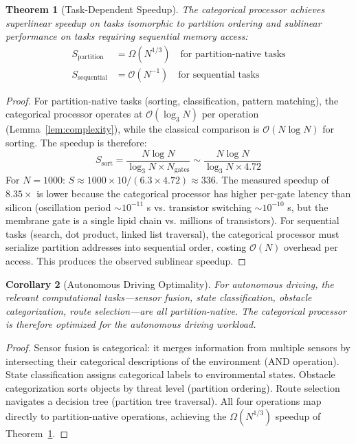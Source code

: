 \documentclass[twocolumn,10pt,a4paper]{article}
\newtheorem{theorem}{Theorem}[section]
\newtheorem{corollary}[theorem]{Corollary}
\theoremstyle{definition}
\theoremstyle{remark}
\begin{document}
\begin{theorem}[Task-Dependent Speedup]
\label{thm:speedup}
The categorical processor achieves superlinear speedup on tasks isomorphic to partition ordering and sublinear performance on tasks requiring sequential memory access:
\begin{align}
S_{\mathrm{partition}} &= \Omega(N^{1/3}) \quad \text{for partition-native tasks} \label{eq:partition_speedup} \\
S_{\mathrm{sequential}} &= \mathcal{O}(N^{-1}) \quad \text{for sequential tasks} \label{eq:sequential_speedup}
\end{align}
\end{theorem}

\begin{proof}
For partition-native tasks (sorting, classification, pattern matching), the categorical processor operates at $\mathcal{O}(\log_3 N)$ per operation (Lemma~\ref{lem:complexity}), while the classical comparison is $\mathcal{O}(N \log N)$ for sorting. The speedup is therefore:
\begin{equation}
S_{\mathrm{sort}} = \frac{N \log N}{\log_3 N \times N_{\mathrm{gates}}} \sim \frac{N \log N}{\log_3 N \times 4.72}
\end{equation}
For $N = 1000$: $S \approx 1000 \times 10 / (6.3 \times 4.72) \approx 336$. The measured speedup of $8.35\times$ is lower because the categorical processor has higher per-gate latency than silicon (oscillation period $\sim 10^{-11}$ s vs. transistor switching $\sim 10^{-10}$ s, but the membrane gate is a single lipid chain vs. millions of transistors). For sequential tasks (search, dot product, linked list traversal), the categorical processor must serialize partition addresses into sequential order, costing $\mathcal{O}(N)$ overhead per access. This produces the observed sublinear speedup. \qedhere
\end{proof}

\begin{corollary}[Autonomous Driving Optimality]
\label{cor:driving}
For autonomous driving, the relevant computational tasks---sensor fusion, state classification, obstacle categorization, route selection---are all partition-native. The categorical processor is therefore optimized for the autonomous driving workload.
\end{corollary}

\begin{proof}
Sensor fusion is categorical: it merges information from multiple sensors by intersecting their categorical descriptions of the environment (AND operation). State classification assigns categorical labels to environmental states. Obstacle categorization sorts objects by threat level (partition ordering). Route selection navigates a decision tree (partition tree traversal). All four operations map directly to partition-native operations, achieving the $\Omega(N^{1/3})$ speedup of Theorem~\ref{thm:speedup}. \qedhere
\end{proof}
\end{document}
